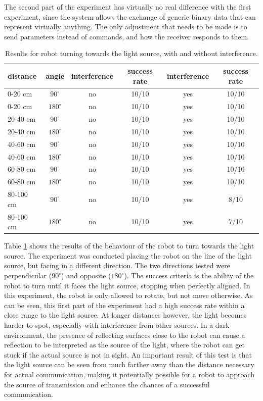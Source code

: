 The second part of the experiment has virtually no real difference with the first experiment, since the system allows the exchange of generic binary data that can represent virtually anything.
The only adjustment that needs to be made is to send parameters instead of commands, and how the receiver responds to them.
%
\newline
\begin{table}[hbt]
\centering
  \begin{tabular}{l c | c c || c c}
  distance & angle & interference & success rate & interference & success rate\\
    \hline
    0-20 cm & $90^{\circ}$ & no & 10/10 & yes & 10/10\\
    0-20 cm &  $180^{\circ}$ & no & 10/10 & yes & 10/10\\
   20-40 cm &  $90^{\circ}$ & no &10/10 & yes & 10/10\\
   20-40 cm &  $180^{\circ}$ & no &10/10 & yes & 10/10\\
   40-60 cm &  $90^{\circ}$ & no & 10/10 & yes & 10/10\\
   40-60 cm &  $180^{\circ}$ & no & 10/10 & yes & 10/10\\
   60-80 cm &  $90^{\circ}$ & no & 10/10 & yes & 10/10\\
   60-80 cm &  $180^{\circ}$ & no & 10/10 & yes & 10/10\\
  80-100 cm &  $90^{\circ}$ & no & 10/10 & yes & 8/10\\
  80-100 cm &  $180^{\circ}$ & no & 10/10 & yes & 7/10\\
  \end{tabular}
  \caption{Results for robot turning towards the light source, with and without interference.}
  \label{tab:turning}
\end{table}
%
Table \ref{tab:turning} shows the results of the behaviour of the robot to turn towards the light source.
The experiment was conducted placing the robot on the line of the light source, but facing in a different direction.
The two directions tested were perpendicular ($90^{\circ}$) and opposite ($180^{\circ}$).
The success criteria is the ability of the robot to turn until it faces the light source, stopping when perfectly aligned.
In this experiment, the robot is only allowed to rotate, but not move otherwise.
As can be seen, this first part of the experiment had a high success rate within a close range to the light source.
At longer distances however, the light becomes harder to spot, especially with interference from other sources.
In a dark environment, the presence of reflecting surfaces close to the robot can cause a reflection to be interpreted as the source of the light, where the robot can get stuck if the actual source is not in sight.
An important result of this test is that the light source can be seen from much farther away than the distance necessary for actual communication, making it potentially possible for a robot to approach the source of transmission and enhance the chances of a successful communication.

